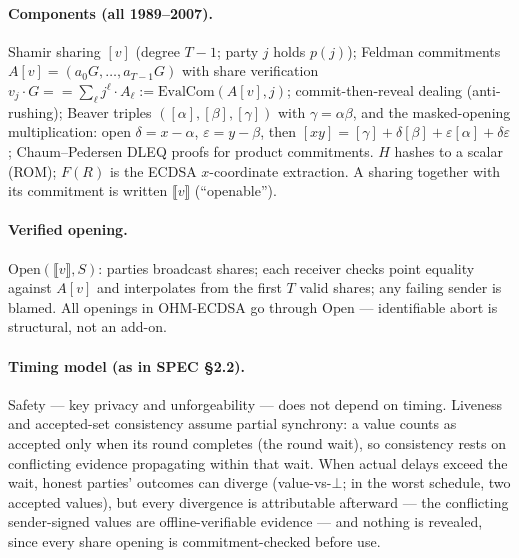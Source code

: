 \documentclass[11pt]{article}
\theoremstyle{plain}
\theoremstyle{definition}
\theoremstyle{remark}
\newcommand{\share}[1]{[#1]}
\newcommand{\oshare}[1]{\llbracket #1 \rrbracket}
\newcommand{\EvalCom}{\mathrm{EvalCom}}
\begin{document}
\paragraph{Components (all 1989--2007).} Shamir sharing $\share{v}$ (degree $T{-}1$; party $j$ holds $p(j)$); Feldman commitments $A\share{v} = (a_0 G, \dots, a_{T-1} G)$ with share verification $v_j \cdot G == \sum_\ell j^\ell \cdot A_\ell := \EvalCom(A\share{v}, j)$; commit-then-reveal dealing (anti-rushing); Beaver triples $(\share{\alpha}, \share{\beta}, \share{\gamma})$ with $\gamma = \alpha\beta$, and the masked-opening multiplication: open $\delta = x - \alpha$, $\varepsilon = y - \beta$, then $\share{xy} = \share{\gamma} + \delta\share{\beta} + \varepsilon\share{\alpha} + \delta\varepsilon$; Chaum--Pedersen DLEQ proofs for product commitments. $H$ hashes to a scalar (ROM); $F(R)$ is the ECDSA $x$-coordinate extraction. A sharing together with its commitment is written $\oshare{v}$ (``openable'').

\paragraph{Verified opening.} $\mathrm{Open}(\oshare{v}, S)$: parties broadcast shares; each receiver checks point equality against $A\share{v}$ and interpolates from the first $T$ valid shares; any failing sender is blamed. All openings in OHM-ECDSA go through $\mathrm{Open}$ --- identifiable abort is structural, not an add-on.

\paragraph{Timing model (as in SPEC \S2.2).} Safety --- key privacy and unforgeability --- does not depend on timing. Liveness and accepted-set consistency assume partial synchrony: a value counts as accepted only when its round completes (the round wait), so consistency rests on conflicting evidence propagating within that wait. When actual delays exceed the wait, honest parties' outcomes can diverge (value-vs-$\bot$; in the worst schedule, two accepted values), but every divergence is attributable afterward --- the conflicting sender-signed values are offline-verifiable evidence --- and nothing is revealed, since every share opening is commitment-checked before use.
\end{document}
